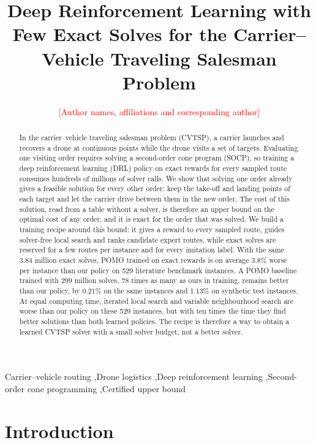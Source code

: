 \documentclass[preprint,12pt,authoryear]{elsarticle}
\newcommand{\placeholder}[1]{\textcolor{red}{[#1]}}
\begin{document}
\begin{frontmatter}

\title{Deep Reinforcement Learning with Few Exact Solves for the Carrier--Vehicle Traveling Salesman Problem}

\author{\placeholder{Author names, affiliations and corresponding author}}

\begin{abstract}
In the carrier--vehicle traveling salesman problem (CVTSP), a carrier launches and recovers a drone at continuous points while the drone visits a set of targets. Evaluating one visiting order requires solving a second-order cone program (SOCP), so training a deep reinforcement learning (DRL) policy on exact rewards for every sampled route consumes hundreds of millions of solver calls. We show that solving one order already gives a feasible solution for every other order: keep the take-off and landing points of each target and let the carrier drive between them in the new order. The cost of this solution, read from a table without a solver, is therefore an upper bound on the optimal cost of any order, and it is exact for the order that was solved. We build a training recipe around this bound: it gives a reward to every sampled route, guides solver-free local search and ranks candidate expert routes, while exact solves are reserved for a few routes per instance and for every imitation label. With the same 3.84 million exact solves, POMO trained on exact rewards is on average 3.8\% worse per instance than our policy on 529 literature benchmark instances. A POMO baseline trained with 299 million solves, 78 times as many as ours in training, remains better than our policy, by 0.21\% on the same instances and 1.13\% on synthetic test instances. At equal computing time, iterated local search and variable neighbourhood search are worse than our policy on these 529 instances, but with ten times the time they find better solutions than both learned policies. The recipe is therefore a way to obtain a learned CVTSP solver with a small solver budget, not a better solver.
\end{abstract}

\begin{keyword}
Carrier--vehicle routing \sep Drone logistics \sep Deep reinforcement learning \sep Second-order cone programming \sep Certified upper bound
\end{keyword}

\end{frontmatter}

\section{Introduction}
\label{sec:intro}
\end{document}
